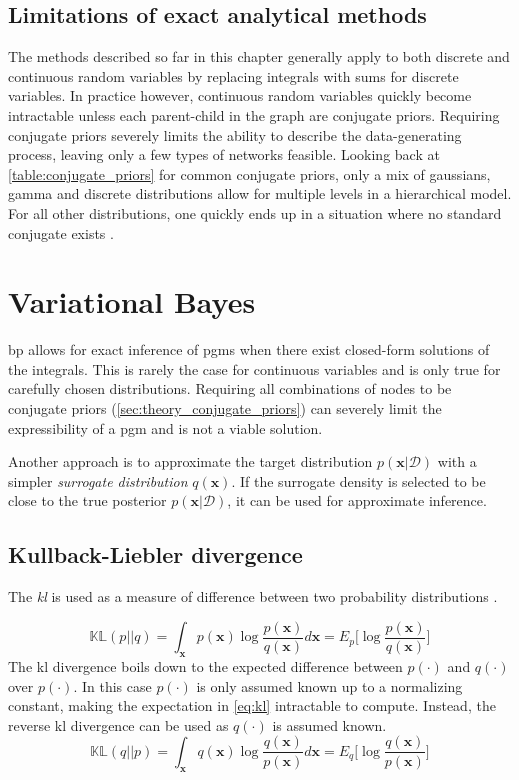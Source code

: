 \subsection{Limitations of exact analytical methods}
The methods described so far in this chapter generally apply to both discrete and continuous random variables by replacing integrals with sums for discrete variables. In practice however, continuous random variables quickly become intractable unless each parent-child in the graph are conjugate priors. Requiring conjugate priors severely limits the ability to describe the data-generating process, leaving only a few types of networks feasible. Looking back at \cref{table:conjugate_priors} for common conjugate priors, only a mix of gaussians, gamma and discrete distributions allow for multiple levels in a hierarchical model. For all other distributions, one quickly ends up in a situation where no standard conjugate exists \cite{winnbishop}. 
\section{Variational Bayes}
\acrshort{bp} allows for exact inference of \acrshort{pgm}s when there exist closed-form solutions of the integrals. This is rarely the case for continuous variables and is only true for carefully chosen distributions. Requiring all combinations of nodes to be conjugate priors (\cref{sec:theory_conjugate_priors}) can severely limit the expressibility of a \acrshort{pgm} and is not a viable solution. 

Another approach is to approximate the target distribution $p(\mathbf{x} | \mathcal{D})$ with a simpler \textit{surrogate distribution} $q(\mathbf{x})$. If the surrogate density is selected to be close to the true posterior $p(\mathbf{x} | \mathcal{D})$, it can be used for approximate inference. 

\subsection{Kullback-Liebler divergence}
The \textit{\acrfull{kl}}  is used as a measure of difference between two probability distributions \cite{kullback1951,murphy}.

\begin{equation}\label{eq:kl}
    \mathbb{KL}(p || q) = \int_\mathbf{x} p(\mathbf{x}) \log \frac{p(\mathbf{x})}{q(\mathbf{x})} d\mathbf{x} = E_{p} \big[ \log \frac{p(\mathbf{x})}{q(\mathbf{x})} \big]
\end{equation}
The \acrshort{kl} divergence boils down to the expected difference between $p(\cdot)$ and $q(\cdot)$ over $p(\cdot)$.
In this case $p(\cdot)$ is only assumed known up to a normalizing constant, making the expectation in \cref{eq:kl} intractable to compute. Instead, the reverse \acrshort{kl} divergence can be used as $q(\cdot)$ is assumed known.
\begin{equation}\label{eq:reverse_kl}
    \mathbb{KL}(q || p) = \int_\mathbf{x} q(\mathbf{x}) \log \frac{q(\mathbf{x})}{p(\mathbf{x})} d\mathbf{x} = E_{q} \big[ \log \frac{q(\mathbf{x})}{p(\mathbf{x})} \big]
\end{equation}

